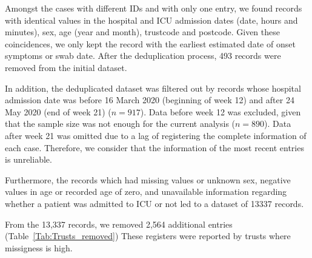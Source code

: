 \documentclass[review]{elsarticle}
\begin{document}
Amongst the cases with different IDs and with only one entry, we found records with identical values in the hospital and ICU admission dates (date, hours and minutes), sex, age (year and month), trustcode and postcode. Given these coincidences, we only kept the record with the earliest estimated date of onset symptoms or swab date. After the deduplication process, 493 records were removed from the initial dataset.

In addition, the deduplicated dataset was filtered out by records whose hospital admission date was before 16 March 2020 (beginning of week 12) and after 24 May 2020 (end of week 21) ($n = 917$). Data before week 12 was excluded, given that the sample size was not enough for the current analysis ($n = 890$). Data after week 21 was omitted due to a lag of registering the complete information of each case. Therefore, we consider that the information of the most recent entries is unreliable.

Furthermore, the records which had missing values or unknown sex, negative values in age or recorded age of zero, and unavailable information regarding whether a patient was admitted to ICU or not led to a dataset of 13337 records.

From the 13,337 records, we removed 2,564 additional entries (Table~\ref{Tab:Trusts_removed}) These registers were reported by trusts where missigness is high.
\end{document}
